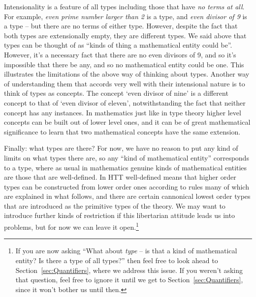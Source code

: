 Intensionality is a feature of all types including those that have \emph{no terms at all}. 
For example, \emph{even prime number larger than 2} is a type, 
and \emph{even divisor of 9} is a type -- but there are no terms of either type. However, despite the fact that both types are extensionally empty, they are different types. We said above that types can be thought of as ``kinds of thing a mathematical entity could be''.  However, it's a necessary fact that there are no even divisors of 9, and so it's impossible that there be any, and so no mathematical entity could be one. This illustrates the limitations of the above way of thinking about types. Another way of understanding them that accords very well with their intensional nature is to think of types as concepts. The concept `even divisor of nine' is a different concept to that of `even divisor of eleven', notwithstanding the fact that neither concept has any instances. In mathematics just like in type theory higher level concepts can be built out of lower level ones, and it can be of great mathematical significance to learn that two mathematical concepts have the same extension.

Finally: what types are there?  
For now, we have no reason to put any kind of limits on what types there are, so any ``kind of mathematical entity'' corresponds to a type, where as usual in mathematics genuine kinds of mathematical entities are those that are well-defined. In HTT well-defined means that higher order types can be constructed from lower order ones according to rules many of which are explained in what follows, and there are certain cannonical lowest order types that are introduced as the primitive types of the theory. We may want to introduce further kinds of restriction if this libertarian attitude leads us into problems, but for now we can leave it open.\footnote{
If you are now asking ``What about \emph{type} -- is that a kind of mathematical entity?  Is there a type of all types?'' then feel free to look ahead to Section~\ref{sec:Quantifiers}, where we address this issue.  If you weren't asking that question, feel free to ignore it until we get to Section~\ref{sec:Quantifiers}, since it won't bother us until then.
}


